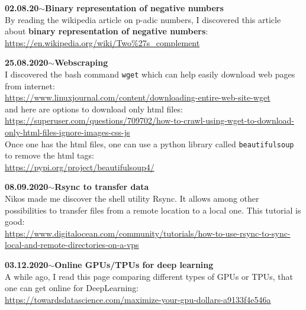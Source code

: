 \documentclass[11pt,a4paper]{article}
\newenvironment{loggentry}[2]%
{\noindent\textbf{#1}\hspace{1cm}$\mathbf{\sim}$\text{ }\textbf{#2}\\}{\vspace{0.5cm}}
\begin{document}
\begin{loggentry}{02.08.20}{Binary representation of negative numbers}

By reading the wikipedia article on p-adic numbers, I discovered this article about \textbf{binary representation of negative numbers}:\\
\url{https://en.wikipedia.org/wiki/Two%27s_complement}

\end{loggentry}


\begin{loggentry}{25.08.2020}{Webscraping}

I discovered the bash command \texttt{wget} which can help easily download web pages from internet:\\
\url{https://www.linuxjournal.com/content/downloading-entire-web-site-wget}\\
and here are options to download only html files:\\
\url{https://superuser.com/questions/709702/how-to-crawl-using-wget-to-download-only-html-files-ignore-images-css-js}\\

Once one has the html files, one can use a python library called \texttt{beautifulsoup} to remove the html tags:\\
\url{https://pypi.org/project/beautifulsoup4/}\\

\end{loggentry}


\begin{loggentry}{08.09.2020}{Rsync to transfer data}

Nikos made me discover the shell utility Rsync. It allows among other possibilities to transfer files from a remote location to a local one. This tutorial is good:\\
\url{https://www.digitalocean.com/community/tutorials/how-to-use-rsync-to-sync-local-and-remote-directories-on-a-vps}\\

\end{loggentry}


\begin{loggentry}{03.12.2020}{Online GPUs/TPUs for deep learning}

A while ago, I read this page comparing different types of GPUs or TPUs, that one can get online for DeepLearning:\\
\url{https://towardsdatascience.com/maximize-your-gpu-dollars-a9133f4e546a}

\end{loggentry}
\end{document}
